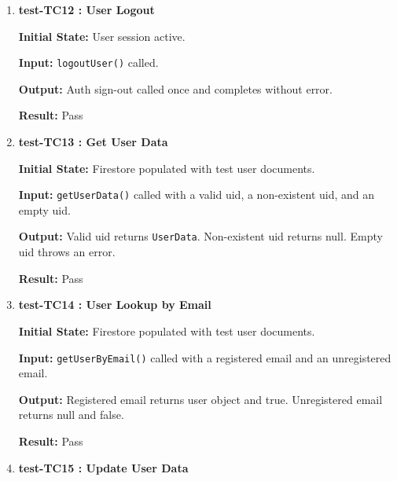 \documentclass[12pt, titlepage]{article}
\begin{document}
\begin{enumerate}
	\textbf{Initial State:} Login screen available; valid Firebase Auth credentials exist but no Firestore profile.
	
	\textbf{Input:} \texttt{loginUser()} called with valid credentials.
	
	\textbf{Output:} Error ``User profile missing in Firestore'' thrown. Login rejected.
	
	\textbf{Result:} Pass
	
	\vspace{0.5em}
	
	\item \textbf{test-TC12 : User Logout}
	
	\textbf{Initial State:} User session active.
	
	\textbf{Input:} \texttt{logoutUser()} called.
	
	\textbf{Output:} Auth sign-out called once and completes without error.
	
	\textbf{Result:} Pass
	
	\vspace{0.5em}
	
	\item \textbf{test-TC13 : Get User Data}
	
	\textbf{Initial State:} Firestore populated with test user documents.
	
	\textbf{Input:} \texttt{getUserData()} called with a valid uid, a non-existent uid, and an empty uid.
	
	\textbf{Output:} Valid uid returns \texttt{UserData}. Non-existent uid returns null. Empty uid throws an error.
	
	\textbf{Result:} Pass
	
	\vspace{0.5em}
	
	\item \textbf{test-TC14 : User Lookup by Email}
	
	\textbf{Initial State:} Firestore populated with test user documents.
	
	\textbf{Input:} \texttt{getUserByEmail()} called with a registered email and an unregistered email.
	
	\textbf{Output:} Registered email returns user object and true. Unregistered email returns null and false.
	
	\textbf{Result:} Pass
	
	\vspace{0.5em}
	
	\item \textbf{test-TC15 : Update User Data}
	

\end{enumerate}
\end{document}
